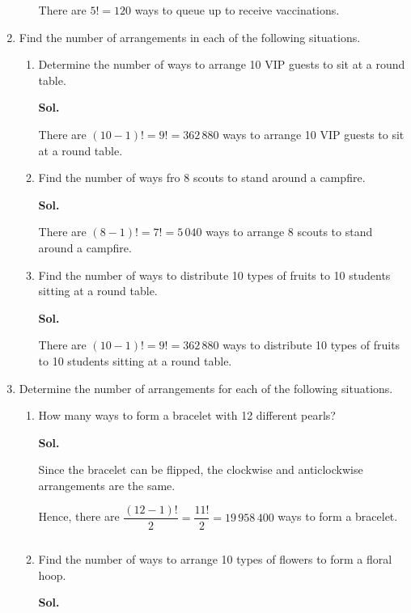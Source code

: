 \documentclass{report}
\newcommand{\sol}[1]{

      \noindent \textbf{Sol.}
}
\def\eos{\quad\hbox{\rlap{\hbox{\vrule depth 1.5pt height 2.6mm width 0.2mm \hskip 1mm \vrule height 2.6mm width 0.2mm}}{\vbox{\hrule height 0.2mm width 1.4mm \vskip 2.8mm \hrule depth 1.5pt height -0.35mm width 1.2mm}}}}
\begin{document}
\begin{multicols*}{2}
\begin{enumerate}
\begin{enumerate}
                              There are $5! = 120$ ways to queue up to receive vaccinations. $\eos$
                  \end{enumerate}

            \item Find the number of arrangements in each of the following situations.
                  \begin{enumerate}
                        \item Determine the number of ways to arrange 10 VIP guests to sit at a round table.
                              \sol{}

                              There are $(10 - 1)! = 9! = 362\,880$ ways to arrange 10 VIP guests to sit at a
                              round table. $\eos$

                        \item Find the number of ways fro 8 scouts to stand around a campfire. \sol{}

                              There are $(8 - 1)! = 7! = 5\,040$ ways to arrange 8 scouts to stand around a
                              campfire. $\eos$

                        \item Find the number of ways to distribute 10 types of fruits to 10 students sitting
                              at a round table. \sol{}

                              There are $(10 - 1)! = 9! = 362\,880$ ways to distribute 10 types of fruits to
                              10 students sitting at a round table. $\eos$
                  \end{enumerate}

            \item Determine the number of arrangements for each of the following situations.
                  \begin{enumerate}
                        \item How many ways to form a bracelet with 12 different pearls? \sol{}

                              Since the bracelet can be flipped, the clockwise and anticlockwise arrangements
                              are the same.

                              Hence, there are $\dfrac{(12 - 1)!}{2} = \dfrac{11!}{2} = 19\,958\,400$ ways to
                              form a bracelet. $\eos$

                        \item Find the number of ways to arrange 10 types of flowers to form a floral hoop.
                              \sol{}


\end{enumerate}
\end{enumerate}
\end{multicols*}
\end{document}
